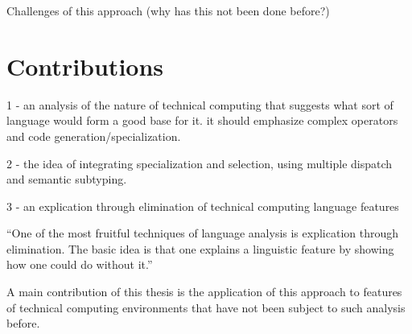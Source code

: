 Challenges of this approach (why has this not been done before?)


\section{Contributions}

1 - an analysis of the nature of technical computing that suggests what
sort of language would form a good base for it. it should emphasize
complex operators and code generation/specialization.

2 - the idea of integrating specialization and selection, using multiple dispatch
and semantic subtyping.

3 - an explication through elimination of technical computing language features

``One of the most fruitful techniques of language analysis is explication through
elimination. The basic idea is that one explains a linguistic feature by showing
how one could do without it.'' \cite{morris}

A main contribution of this thesis is the application of this approach to features
of technical computing environments that have not been subject to such analysis
before.
